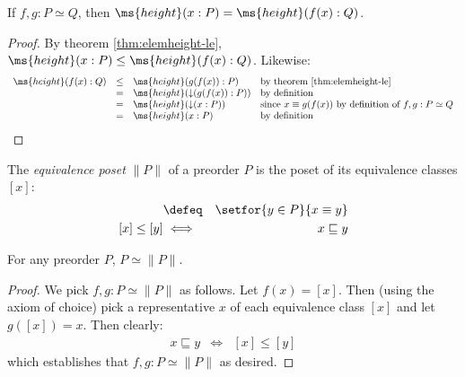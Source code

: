 \documentclass{article}
\newcommand{\ale}{\sqsubseteq}
\newcommand{\aeq}{\equiv}
\newcommand{\ordeq}{\simeq}
\newcommand{\eqposet}[1]{\ms{Eq}(#1)}
\renewcommand{\eqposet}[1]{\|{#1}\|}
\newcommand{\eqclass}[1]{[#1]}
\newcommand{\height}{\ms{height}}
\newcommand{\elemheight}[2]{\height(#2 : #1)}
\newcommand{\down}[2]{\mathop{\downarrow}(#2 : #1)}
\begin{document}
\begin{theorem}
  If $f,g : P \ordeq Q$, then $\elemheight{P}{x} = \elemheight{Q}{f(x)}$.
\end{theorem}
\begin{proof}
  By theorem \ref{thm:elemheight-le}, $\elemheight{P}{x} \le
  \elemheight{Q}{f(x)}$. Likewise:
  \[
  \begin{array}{rcll}
    \elemheight{Q}{f(x)}
    &\le& \elemheight{P}{g(f(x))} & \text{by theorem \ref{thm:elemheight-le}}\\
    &=& \height(\down{P}{g(f(x))}) & \text{by definition}\\
    &=& \height(\down{P}{x})
    & \text{since}~x \equiv g(f(x))~\text{by definition of}~f,g : P \ordeq Q\\
    &=& \elemheight{P}{x} & \text{by definition}
  \end{array}
  \]
\end{proof}

\begin{definition}
  The \emph{equivalence poset} $\eqposet{P}$ of a preorder $P$ is the poset of
  its equivalence classes $\eqclass{x}$:
  \begin{eqnarray*}
    \eqclass{x}  &\defeq&  \setfor{y \in P}{x \aeq y}\\
    \eqclass{x} \le \eqclass{y} &\iff& x \ale y
  \end{eqnarray*}
\end{definition}

\begin{theorem}
  \label{thm:eqposet}
  For any preorder $P$, $P \ordeq \eqposet{P}$.
\end{theorem}
\begin{proof}
  We pick $f,g : P \ordeq \eqposet{P}$ as follows. Let $f(x) = \eqclass{x}$.
  Then (using the axiom of choice) pick a representative $x$ of each equivalence
  class $\eqclass{x}$ and let $g(\eqclass{x}) = x$. Then clearly:
  \begin{eqnarray*}
    x \ale y &\iff& \eqclass{x} \le \eqclass{y}
  \end{eqnarray*}
  which establishes that $f,g : P \ordeq \eqposet{P}$ as desired.
\end{proof}

\end{document}
